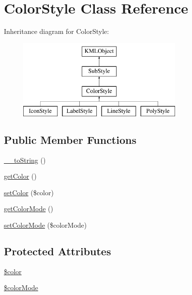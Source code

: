 \hypertarget{classColorStyle}{
\section{ColorStyle Class Reference}
\label{dd/d0f/classColorStyle}
}
Inheritance diagram for ColorStyle:\begin{figure}[H]
\begin{center}
\leavevmode
\includegraphics[height=4.000000cm]{dd/d0f/classColorStyle}
\end{center}
\end{figure}
\subsection*{Public Member Functions}
\begin{DoxyCompactItemize}
\item 
\hyperlink{classColorStyle_a08cf5225003d7b88e61f2d91a5bd2527}{\_\-\_\-toString} ()
\item 
\hyperlink{classColorStyle_a4392440a75dacd9c3c29cb5c485a29d8}{getColor} ()
\item 
\hyperlink{classColorStyle_ab40c9f81bce76f07a5b6032d34c09b9a}{setColor} (\$color)
\item 
\hyperlink{classColorStyle_af277a5a1512109fe190f98b4e95d4fd5}{getColorMode} ()
\item 
\hyperlink{classColorStyle_a0cdc512135b7bb69cda1ee469d14e772}{setColorMode} (\$colorMode)
\end{DoxyCompactItemize}
\subsection*{Protected Attributes}
\begin{DoxyCompactItemize}
\item 
\hyperlink{classColorStyle_a8022afc3225d8bfd5c6b61950c309808}{\$color}
\item 
\hyperlink{classColorStyle_a8fb0a07eac2cda32814e1f779c97b5a5}{\$colorMode}
\end{DoxyCompactItemize}


